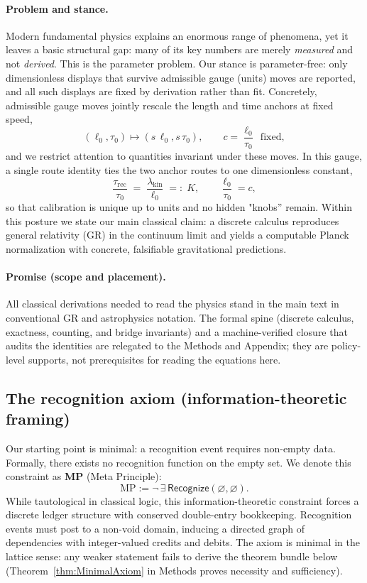\documentclass[11pt]{article}
\begin{document}
\paragraph{Problem and stance.}
Modern fundamental physics explains an enormous range of phenomena, yet it leaves a basic structural gap: many of its key numbers are merely \emph{measured} and not \emph{derived}. This is the parameter problem. Our stance is parameter-free: only dimensionless displays that survive admissible gauge (units) moves are reported, and all such displays are fixed by derivation rather than fit. Concretely, admissible gauge moves jointly rescale the length and time anchors at fixed speed,
\[
(\ell_0,\tau_0)\mapsto (s\,\ell_0,s\,\tau_0),\qquad c=\frac{\ell_0}{\tau_0}\ \ \text{fixed},
\]
and we restrict attention to quantities invariant under these moves. In this gauge, a single route identity ties the two anchor routes to one dimensionless constant,
\[
\frac{\tau_{\mathrm{rec}}}{\tau_0}\;=\;\frac{\lambda_{\mathrm{kin}}}{\ell_0}\;=:\;K,\qquad \frac{\ell_0}{\tau_0}=c,
\]
so that calibration is unique up to units and no hidden "knobs'' remain. Within this posture we state our main classical claim: a discrete calculus reproduces general relativity (GR) in the continuum limit and yields a computable Planck normalization with concrete, falsifiable gravitational predictions.

\paragraph{Promise (scope and placement).}
All classical derivations needed to read the physics stand in the main text in conventional GR and astrophysics notation. The formal spine (discrete calculus, exactness, counting, and bridge invariants) and a machine-verified closure that audits the identities are relegated to the Methods and Appendix; they are policy-level supports, not prerequisites for reading the equations here.

\subsection*{The recognition axiom (information-theoretic framing)}

Our starting point is minimal: a recognition event requires non-empty data. Formally, there exists no recognition function on the empty set. We denote this constraint as \textbf{MP} (Meta Principle):
\[
\text{MP} := \neg\,\exists\,\mathsf{Recognize}(\varnothing,\varnothing).
\]
While tautological in classical logic, this information-theoretic constraint forces a discrete ledger structure with conserved double-entry bookkeeping. Recognition events must post to a non-void domain, inducing a directed graph of dependencies with integer-valued credits and debits. The axiom is minimal in the lattice sense: any weaker statement fails to derive the theorem bundle below (Theorem~\ref{thm:MinimalAxiom} in Methods proves necessity and sufficiency).
\end{document}
